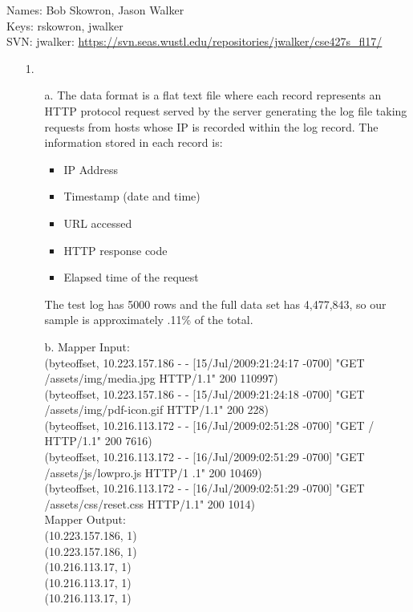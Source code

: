 \documentclass{article}
\begin{document}
\begin{flushleft}
Names: Bob Skowron, Jason Walker\\
Keys: rskowron, jwalker\\
SVN: jwalker: \url{https://svn.seas.wustl.edu/repositories/jwalker/cse427s_fl17/}\\
\end{flushleft}

\begin{itemize}
\item[1.] 
	\begin{itemize}
	\item[a.] The data format is a flat text file where each record represents an HTTP protocol request served by the server generating the log file taking requests from hosts whose IP is recorded within the log record. The information stored in each record is:\\
		\begin{itemize}
		\item IP Address
		\item Timestamp (date and time)
		\item URL accessed
		\item HTTP response code
		\item Elapsed time of the request
		\end{itemize}
	The test log has 5000 rows and the full data set has 4,477,843, so our sample is approximately .11\% of the total.	
	
	\item[b.] Mapper Input:\\
		(byteoffset, 10.223.157.186 - - [15/Jul/2009:21:24:17 -0700] "GET /assets/img/media.jpg HTTP/1.1" 200 110997)\\
		(byteoffset, 10.223.157.186 - - [15/Jul/2009:21:24:18 -0700] "GET /assets/img/pdf-icon.gif HTTP/1.1" 200 228)\\
		(byteoffset, 10.216.113.172 - - [16/Jul/2009:02:51:28 -0700] "GET / HTTP/1.1" 200 7616)\\
		(byteoffset, 10.216.113.172 - - [16/Jul/2009:02:51:29 -0700] "GET /assets/js/lowpro.js HTTP/1 .1" 200 10469)\\
		(byteoffset, 10.216.113.172 - - [16/Jul/2009:02:51:29 -0700] "GET /assets/css/reset.css HTTP/1.1" 200 1014)\\
		
	Mapper Output:\\
		(10.223.157.186, 1)\\
		(10.223.157.186, 1)\\
		(10.216.113.17, 1)\\
		(10.216.113.17, 1)\\
		(10.216.113.17, 1)\\


\end{itemize}
\end{itemize}
\end{document}
